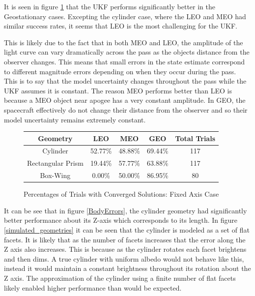 It is seen in figure \ref{Fixed_per_orbit} that the UKF performs significantly better in the Geostationary cases. Excepting the cylinder case, where the LEO and MEO had similar success rates, it seems that LEO is the most challenging for the UKF.

This is likely due to the fact that in both MEO and LEO, the amplitude of the light curve can vary dramatically across the pass as the objects distance from the observer changes. This means that small errors in the state estimate correspond to different magnitude errors depending on when they occur during the pass. This is to say that the model uncertainty changes throughout the pass while the UKF assumes it is constant. The reason MEO performs better than LEO is because a MEO object near apogee has a very constant amplitude. In GEO, the spacecraft effectively do not change their distance from the observer and so their model uncertainty remains extremely constant.

\begin{figure}[h!]
	\begin{center}
		\begin{tabular}{| c | c | c | c | c |}
			\hline Geometry & LEO & MEO & GEO & Total Trials\\ 
			\hline Cylinder & 52.77\% & 48.88\% & 69.44\% & 117 \\
			\hline Rectangular Prism & 19.44\% & 57.77\% & 63.88\% & 117\\
			\hline Box-Wing & 0.00\% & 50.00\% & 86.95\% & 80\\
			\hline
		\end{tabular}
	\end{center}
	\caption{Percentages of Trials with Converged Solutions: Fixed Axis Case}
	\label{Fixed_per_orbit}
\end{figure}

It can be see that in figure \ref{BodyErrors}, the cylinder geometry had significantly better performance about its Z-axis which corresponds to its length. In figure \ref{simulated_geometries} it can be seen that the cylinder is modeled as a set of flat facets. It is likely that as the number of facets increases that the error along the Z axis also increases. This is because as the cylinder rotates each facet brightens and then dims. A true cylinder with uniform albedo would not behave like this, instead it would maintain a constant brightness throughout its rotation about the Z axis. The approximation of the cylinder using a finite number of flat facets likely enabled higher performance than would be expected.

